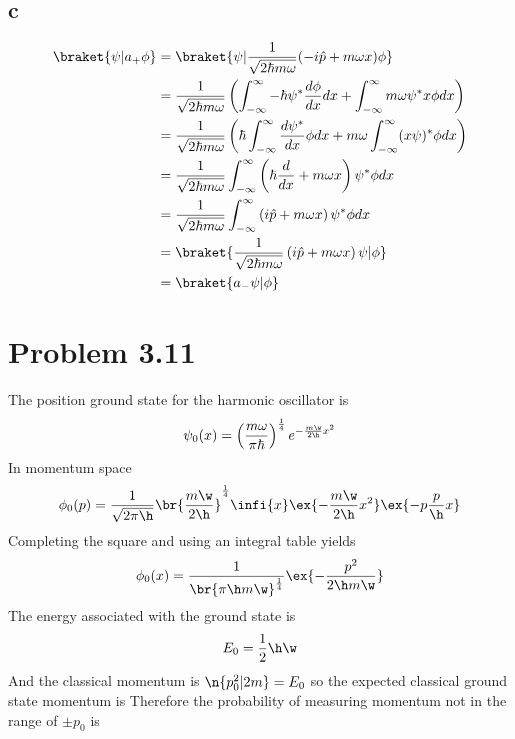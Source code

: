 \subsection*{c}
\begin{equation}
    \begin{split}
        \braket{\psi|a_+\phi} &= \braket{\psi|\frac{1}{\sqrt{2\hbar m \omega}}(-i\hat{p}+m\omega x)\phi}\\
        &= \frac{1}{\sqrt{2\hbar m \omega}} \left( \int_{-\infty}^\infty-\hbar\psi^\ast\frac{d\phi}{dx} dx + \int_{-\infty}^\infty m\omega \psi^\ast x\phi dx\right)\\
        &= \frac{1}{\sqrt{2\hbar m \omega}} \left( \hbar\int_{-\infty}^\infty\frac{d\psi^\ast}{dx}\phi dx + m\omega\int_{-\infty}^\infty (x\psi)^\ast \phi dx\right)\\
        &= \frac{1}{\sqrt{2\hbar m \omega}} \int_{-\infty}^\infty\left( \hbar\frac{d}{dx}+m\omega x\right)\psi^\ast\phi dx\\
        &= \frac{1}{\sqrt{2\hbar m \omega}} \int_{-\infty}^\infty\left( i\hat{p}+m\omega x\right)\psi^\ast\phi dx\\
        &=\braket{ \frac{1}{\sqrt{2\hbar m \omega}} \left( i\hat{p}+m\omega x\right)\psi|\phi}\\
        &=\braket{a_-\psi|\phi}
    \end{split}
\end{equation}
\section*{Problem 3.11}
The position ground state for the harmonic oscillator is
\begin{equation}
    \psi_0(x)=\left( \frac{m\omega}{\pi \hbar}\right)^\frac{1}{4}e^{-\frac{m\w}{2\h}x^2}
\end{equation}
In momentum space
\begin{equation}
    \begin{split}
        \phi_0(p) = \frac{1}{\sqrt{2\pi\h}}\br{\frac{m\w}{2\h}}^\frac{1}{4}\infi{x}\ex{-\frac{m\w}{2\h}x^2}\ex{-p\frac{p}{\h}x}
    \end{split}
\end{equation}
Completing the square and using an integral table yields
\begin{equation}
    \phi_0(x) = \frac{1}{\br{\pi\h m\w}^\frac{1}{4}}\ex{-\frac{p^2}{2\h m\w}}
\end{equation}
The energy associated with the ground state is
\begin{equation}
    E_0 = \frac{1}{2}\h\w
\end{equation}
And the classical momentum is $\n{p_0^2|2m}=E_0$ so the expected classical ground state momentum is
Therefore the probability of measuring momentum not in the range of $\pm p_0$ is

